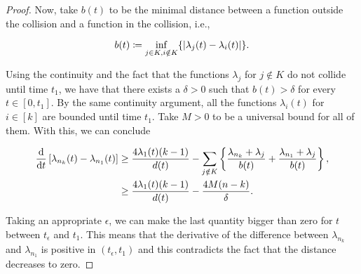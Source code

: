 \begin{proof}
    Now, take $b(t)$ to be the minimal distance between a function outside the collision and a function in the collision, i.e.,

    \begin{equation*}
        b(t) \coloneqq \inf_{j\in K, i\notin K} \{ \lvert \lambda_j(t) - \lambda_i(t) \rvert \}.
    \end{equation*}

    Using the continuity and the fact that the functions $\lambda_j$ for $j \notin K$ do not collide until time $t_1$, we have that there exists a $\delta >0$ such that $b(t) > \delta$ for every $t \in [0,t_1]$. By the same continuity argument, all the functions $\lambda_i(t)$ for $i \in [k]$ are bounded until time $t_1$. Take $M>0$ to be a universal bound for all of them. With this, we can conclude

    \begin{align*}
        \frac{\mathrm d }{\mathrm d t} \left[ \lambda_{n_k}(t) - \lambda_{n_1}(t) \right] &\ge \frac{4\lambda_1(t)(k-1)}{d(t)} - \sum_{j\notin K} \left\{ \frac{\lambda_{n_k} + \lambda_j}{b(t)} + \frac{\lambda_{n_1} + \lambda_j}{b(t)} \right\},\\
        &\ge \frac{4\lambda_1(t)(k-1)}{d(t)} - \frac{4M(n-k)}{\delta}.
    \end{align*}

    Taking an appropriate $\epsilon$, we can make the last quantity bigger than zero for $t$ between $t_\epsilon$ and $t_1$. This means that the derivative of the difference between $\lambda_{n_k}$ and $\lambda_{n_1}$ is positive in $(t_\epsilon, t_1)$ and this contradicts the fact that the distance decreases to zero.
\end{proof}




